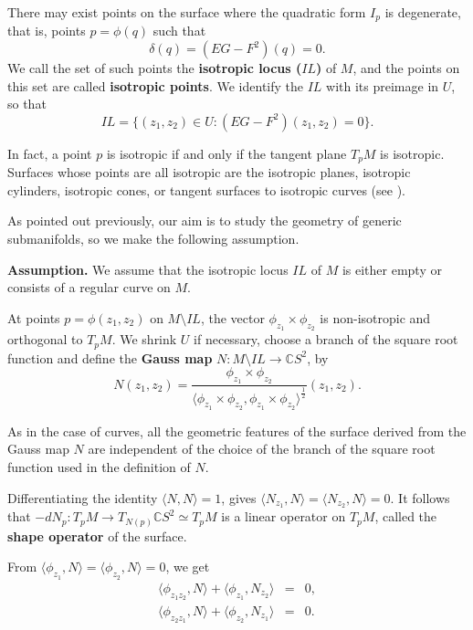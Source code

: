 \documentclass[12pt,a4paper]{article}
\begin{document}
There may exist points on the surface where the quadratic form $I_p$ is degenerate, that is, points $p=\phi(q)$ such that
$$
\delta(q)=(EG-F^2)(q)=0.
$$ 
We call the set of such points the \textbf{isotropic locus ($IL$)} of 
$M$, and the points on this set are called \textbf{isotropic points}.
We identify the $IL$ with its preimage in $U$, so that
$$
IL=\{(z_1,z_2)\in U: (EG-F^2)(z_1,z_2)=0\}.
$$

In fact, a point $p$ is isotropic if and only if the tangent plane $T_pM$ is isotropic. Surfaces whose points are all isotropic are the isotropic planes, isotropic cylinders, isotropic cones, or tangent surfaces to isotropic curves (see \cite[Sections 5–6]{Struik}).

As pointed out previously, our aim is to study the geometry of generic submanifolds, so we make the following assumption.

\medskip
{\bf Assumption.} We assume that the isotropic locus $IL$ of $M$ is either empty or consists of a regular curve on $M$.

\medskip

At points $p=\phi(z_1,z_2)$ on $M\setminus IL$, the vector $\phi_{z_1}\times \phi_{z_2}$ is non-isotropic and  orthogonal to $T_pM$. 
We shrink $U$ if necessary, choose a branch of the square root function and define the
{\bf Gauss map} $N:M\setminus IL\to \mathbb CS^2$,
by 
$$
N(z_1,z_2)=\frac{\phi_{z_1}\times \phi_{z_2}}{\langle \phi_{z_1}\times\phi_{z_2}, {\phi_{z_1}\times\phi_{z_2}}\rangle ^{\frac12}}(z_1,z_2).
$$ 

As in the case of curves, all the geometric features of the surface derived from the Gauss map $N$ are independent of the choice of the branch of the square root function used in the definition of $N$.

Differentiating the identity $\langle N, {N}\rangle =1$, gives 
$\langle N_{z_1}, {N}\rangle =\langle N_{z_2}, {N}\rangle =0$. It follows that 
$-dN_p:T_pM\to T_{N(p)}\mathbb CS^2\simeq T_pM$ is a linear operator on $T_pM$, called the {\bf shape operator} of the surface. 


From $\langle \phi_{z_1}, {N}\rangle = \langle \phi_{z_2}, {N}\rangle=0$, we get 
$$
\begin{array}{rcl}
\langle \phi_{z_1z_2}, {N}\rangle+ \langle \phi_{z_1}, {N_{z_2}}\rangle&=&0,\\
\langle \phi_{z_2z_1}, {N}\rangle+ \langle \phi_{z_2}, {N_{z_1}}\rangle&=&0.
\end{array}
$$
\end{document}
